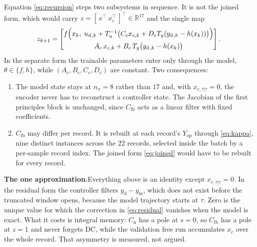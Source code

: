 \documentclass[11pt]{article}
\newcommand{\R}{\mathbb{R}}
\newcommand{\Cfb}{C_{\mathrm{fb}}}
\newcommand{\Cnorm}{C_{\mathrm{n}}}
\newcommand{\udata}{u_{\mathrm{d}}}
\newcommand{\ydata}{y_{\mathrm{d}}}
\newcommand{\ymodel}{y_{\mathrm{m}}}
\newcommand{\Yop}{Y_{\mathrm{op}}}
\newcommand{\Tu}{T_{u}}
\newcommand{\Ty}{T_{y}}
\begin{document}
Equation \eqref{eq:recursion} steps two subsystems in sequence. It is not the joined form, which
would carry $z = [\,x^{\top}\ x_c^{\top}\,]^{\top} \in \R^{17}$ and the single map
\begin{equation}
  z_{k+1} =
  \begin{bmatrix}
    f\Bigl(x_k,\; \udata{}_{,k} + \Tu^{-1}\bigl(C_c x_{c,k}
      + D_c \Ty(\ydata{}_{,k} - h(x_k))\bigr)\Bigr) \\[2mm]
    A_c\,x_{c,k} + B_c\,\Ty\bigl(\ydata{}_{,k} - h(x_k)\bigr)
  \end{bmatrix} .
  \label{eq:joined}
\end{equation}
In the separate form the trainable parameters enter only through the model,
$\theta \in \{f, h\}$, while $(A_c, B_c, C_c, D_c)$ are constant. Two consequences:
\begin{enumerate}
  \item The model state stays at $n_x = 8$ rather than $17$ and, with $x_{c,\tau|\tau} = 0$, the
        encoder never has to reconstruct a controller state. The Jacobian of the first principles
        block is unchanged, since $\Cfb$ acts as a linear filter with fixed coefficients.
  \item $\Cfb$ may differ per record. It is rebuilt at each record's $\Yop$ through
        \eqref{eq:kappa}, nine distinct instances across the 22 records, selected inside the batch
        by a per-sample record index. The joined form \eqref{eq:joined} would have to be rebuilt
        for every record.
\end{enumerate}

\medskip\noindent\textbf{The one approximation.}\quad Everything above is an identity except
$x_{c,\tau|\tau} = 0$. In the residual form the controller filters $\ydata - \ymodel$, which does
not exist before the truncated window opens, because the model trajectory starts at $\tau$. Zero
is the unique value for which the correction in \eqref{eq:residual} vanishes when the model is
exact. What it costs is integral memory: $\Cnorm$ has a pole at $s = 0$, so $\Cfb$ has a pole at
$z = 1$ and never forgets DC, while the validation free run accumulates $x_c$ over the whole
record. That asymmetry is measured, not argued.
\end{document}
